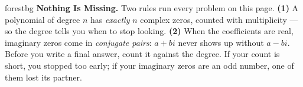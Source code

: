 \documentclass[10pt]{article}
\begin{document}
\namepartnerperiod

\vspace{0.08in}

\begin{headlinebox}{forestbg}
\small\textbf{Nothing Is Missing.} Two rules run every problem on this page. \textbf{(1)} A polynomial
of degree $n$ has \emph{exactly} $n$ complex zeros, counted with multiplicity --- so the degree tells
you when to stop looking. \textbf{(2)} When the coefficients are real, imaginary zeros come in
\emph{conjugate pairs}: $a+bi$ never shows up without $a-bi$. Before you write a final answer, count
it against the degree. If your count is short, you stopped too early; if your imaginary zeros are an
odd number, one of them lost its partner.
\end{headlinebox}

\vspace{0.06in}
\end{document}
